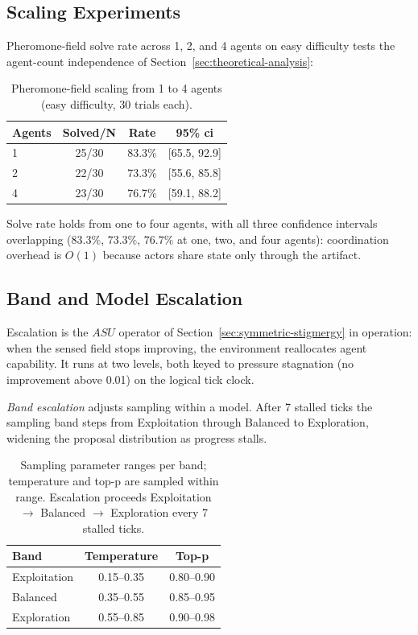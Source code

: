 \subsection{Scaling Experiments}
\label{sec:scaling}

Pheromone-field solve rate across 1, 2, and 4 agents on easy difficulty tests the agent-count independence of Section~\ref{sec:theoretical-analysis}:

\begin{table}[htbp]
\centering
\small
\begin{tabular}{@{}lccc@{}}
\toprule
\textbf{Agents} & \textbf{Solved/N} & \textbf{Rate} & \textbf{95\% \acs{ci}} \\
\midrule
1 & 25/30 & 83.3\% & [65.5, 92.9] \\
2 & 22/30 & 73.3\% & [55.6, 85.8] \\
4 & 23/30 & 76.7\% & [59.1, 88.2] \\
\bottomrule
\end{tabular}
\caption{Pheromone-field scaling from 1 to 4 agents (easy difficulty, 30 trials each).}
\label{tab:scaling}
\end{table}

Solve rate holds from one to four agents, with all three confidence intervals overlapping ($83.3\%$, $73.3\%$, $76.7\%$ at one, two, and four agents): coordination overhead is $O(1)$ because actors share state only through the artifact.

\subsection{Band and Model Escalation}
\label{sec:escalation}

Escalation is the $ASU$ operator of Section~\ref{sec:symmetric-stigmergy} in operation: when the sensed field stops improving, the environment reallocates agent capability. It runs at two levels, both keyed to pressure stagnation (no improvement above 0.01) on the logical tick clock.

\emph{Band escalation} adjusts sampling within a model. After 7 stalled ticks the sampling band steps from Exploitation through Balanced to Exploration, widening the proposal distribution as progress stalls.

\begin{table}[htbp]
\centering
\small
\begin{tabular}{@{}lcc@{}}
\toprule
\textbf{Band} & \textbf{Temperature} & \textbf{Top-p} \\
\midrule
Exploitation & 0.15--0.35 & 0.80--0.90 \\
Balanced & 0.35--0.55 & 0.85--0.95 \\
Exploration & 0.55--0.85 & 0.90--0.98 \\
\bottomrule
\end{tabular}
\caption{Sampling parameter ranges per band; temperature and top-p are sampled within range. Escalation proceeds Exploitation $\to$ Balanced $\to$ Exploration every 7 stalled ticks.}
\label{tab:bands}
\end{table}


